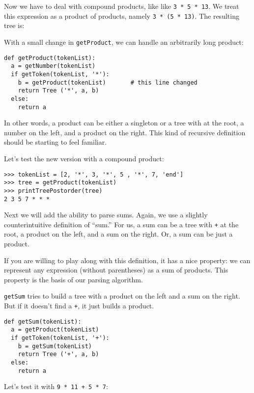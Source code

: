 Now we have to deal with compound products, like like {\tt 3 * 5 *
13}.  We treat this expression as a product of products, namely {\tt 3
* (5 * 13)}.  The resulting tree is:

\beforefig
\centerline{}
\afterfig

With a small change in {\tt getProduct}, we can handle
an arbitrarily long product:

\beforeverb
\begin{verbatim}
def getProduct(tokenList):
  a = getNumber(tokenList)
  if getToken(tokenList, '*'):
    b = getProduct(tokenList)       # this line changed
    return Tree ('*', a, b)
  else:
    return a
\end{verbatim}
\afterverb
%
In other words, a product can be either a singleton or a tree with
{\tt *} at the root, a number on the left, and a product on the right.
This kind of recursive definition should be starting to feel
familiar.


Let's test the new version with a compound product:

\beforeverb
\begin{verbatim}
>>> tokenList = [2, '*', 3, '*', 5 , '*', 7, 'end']
>>> tree = getProduct(tokenList)
>>> printTreePostorder(tree)
2 3 5 7 * * *
\end{verbatim}
\afterverb
%
Next we will add the ability to parse sums.  Again, we
use a slightly counterintuitive definition of ``sum.''
For us, a sum can be a tree with {\tt +} at the root,
a product on the left, and a sum on the right.  Or, a sum
can be just a product.


If you are willing to play along with this definition, it has a nice
property: we can represent any expression (without parentheses) as a
sum of products.  This property is the basis of our parsing algorithm.

{\tt getSum} tries to build a tree with a product on the left and a
sum on the right.  But if it doesn't find a {\tt +}, it just builds a
product.

\beforeverb
\begin{verbatim}
def getSum(tokenList):
  a = getProduct(tokenList)
  if getToken(tokenList, '+'):
    b = getSum(tokenList)
    return Tree ('+', a, b)
  else:
    return a
\end{verbatim}
\afterverb
%
Let's test it with {\tt 9 * 11 + 5 * 7}:

